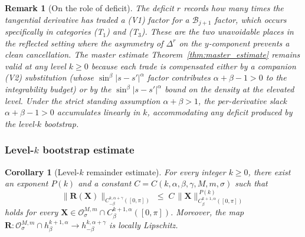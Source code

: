 \documentclass{amsart}
\newtheorem{remark}{Remark}[section]
\newtheorem{corollary}[theorem]{Corollary}
\begin{document}
\begin{remark}[On the role of deficit]\label{rem:deficit}
The deficit $r$ records how many times the tangential derivative has traded a (V1) factor for a $\mathcal{B}_{j+1}$ factor, which occurs specifically in categories (T$_1$) and (T$_3$).  These are the two unavoidable places in the reflected setting where the asymmetry of $\Delta^r$ on the $y$-component prevents a clean cancellation.  The master estimate Theorem~\ref{thm:master_estimate} remains valid at any level $k \ge 0$ because each trade is compensated either by a companion (V2) substitution (whose $\sin^\beta|s-s'|^\alpha$ factor contributes $\alpha+\beta-1>0$ to the integrability budget) or by the $\sin^\beta|s-s'|^\alpha$ bound on the density at the elevated level. Under the strict standing assumption $\alpha + \beta > 1$, the per-derivative slack $\alpha+\beta-1>0$ accumulates linearly in $k$, accommodating any deficit produced by the level-$k$ bootstrap.
\end{remark}

\subsubsection{Level-$k$ bootstrap estimate}

\begin{corollary}[Level-$k$ remainder estimate]\label{cor:level_k_R}
For every integer $k \ge 0$, there exist an exponent $P(k)$ and a constant $C = C(k, \alpha, \beta, \gamma, M, m, \sigma)$ such that
\begin{equation}\label{eq:level_k_R_final}
\|\mathbf{R}(\mathbf{X})\|_{C^{k,\alpha+\gamma}_{-\beta}([0,\pi])}
 \;\le\; C\,\|\mathbf{X}\|_{C^{k+1,\alpha}_\beta([0,\pi])}^{\,P(k)}
\end{equation}
holds for every $\mathbf{X} \in \mathcal{O}^{M,m}_\sigma \cap C^{k+1,\alpha}_\beta([0,\pi])$. Moreover, the map $\mathbf{R}:\mathcal{O}^{M,m}_\sigma \cap h^{k+1,\alpha}_\beta \to h^{k,\alpha+\gamma}_{-\beta}$ is locally Lipschitz.
\end{corollary}
\end{document}
